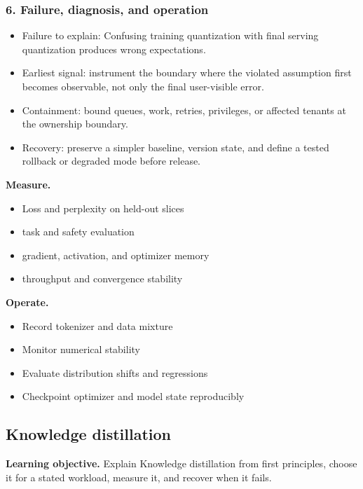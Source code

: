 \subsubsection*{6. Failure, diagnosis, and operation}
\begin{itemize}
\item Failure to explain: Confusing training quantization with final serving quantization produces wrong expectations.
\item Earliest signal: instrument the boundary where the violated assumption first becomes observable, not only the final user-visible error.
\item Containment: bound queues, work, retries, privileges, or affected tenants at the ownership boundary.
\item Recovery: preserve a simpler baseline, version state, and define a tested rollback or degraded mode before release.
\end{itemize}
\textbf{Measure.}\begin{itemize}
\item Loss and perplexity on held-out slices
\item task and safety evaluation
\item gradient, activation, and optimizer memory
\item throughput and convergence stability
\end{itemize}
\textbf{Operate.}\begin{itemize}
\item Record tokenizer and data mixture
\item Monitor numerical stability
\item Evaluate distribution shifts and regressions
\item Checkpoint optimizer and model state reproducibly
\end{itemize}
\subsection{Knowledge distillation}
\textbf{Learning objective.} Explain Knowledge distillation from first principles, choose it for a stated workload, measure it, and recover when it fails.
